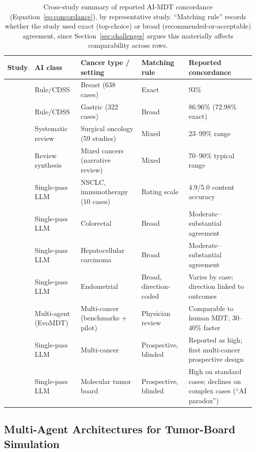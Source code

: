 \documentclass[acmsmall,screen=true,review=false,nonacm=true]{acmart}
\begin{document}
\begin{table}[t]
\centering
\caption{Cross-study summary of reported AI-MDT concordance (Equation~\eqref{eq:concordance}), by representative study. ``Matching rule'' records whether the study used exact (top-choice) or broad (recommended-or-acceptable) agreement, since Section~\ref{sec:challenges} argues this materially affects comparability across rows.}
\label{tab:concordance}
\small
\begin{tabular}{P{2.4cm}P{1.6cm}P{2.6cm}P{1.6cm}P{2.9cm}}
\toprule
\textbf{Study} & \textbf{AI class} & \textbf{Cancer type / setting} & \textbf{Matching rule} & \textbf{Reported concordance} \\
\midrule
\citet{somashekhar2018} & Rule/CDSS & Breast (638 cases) & Exact & 93\% \\
\citet{park2023} & Rule/CDSS & Gastric (322 cases) & Broad & 86.96\% (72.98\% exact) \\
\citet{wu2026} & Systematic review & Surgical oncology (59 studies) & Mixed & 23--99\% range \\
\citet{wang2025iscience} & Review synthesis & Mixed cancers (narrative review) & Mixed & 70--90\% typical range \\
\citet{ismayilov2025} & Single-pass LLM & NSCLC, immunotherapy (10 cases) & Rating scale & 4.9/5.0 content accuracy \\
\citet{chatziisaak2025} & Single-pass LLM & Colorectal & Broad & Moderate--substantial agreement \\
\citet{ciulli2026} & Single-pass LLM & Hepatocellular carcinoma & Broad & Moderate--substantial agreement \\
\citet{aliyev2026} & Single-pass LLM & Endometrial & Broad, direction-coded & Varies by case; direction linked to outcomes \\
\citet{liu2026} & Multi-agent (EvoMDT) & Multi-cancer (benchmarks + pilot) & Physician review & Comparable to human MDT; 30--40\% faster \\
\citet{pinninti2026} & Single-pass LLM & Multi-cancer & Prospective, blinded & Reported as high; first multi-cancer prospective design \\
\citet{seshachalam2026} & Single-pass LLM & Molecular tumor board & Prospective, blinded & High on standard cases; declines on complex cases (``AI paradox'') \\
\bottomrule
\end{tabular}
\end{table}

\subsection{Multi-Agent Architectures for Tumor-Board Simulation}
\label{sec:multiagent}
\end{document}
